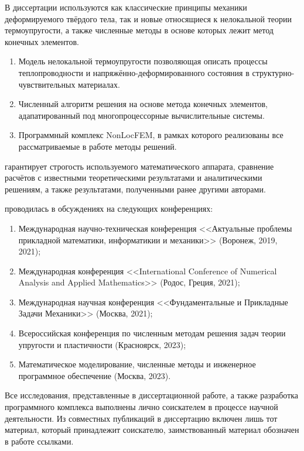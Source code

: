 {\methods}
В диссертации используются как классические принципы механики деформируемого твёрдого тела, так и новые относящиеся к нелокальной теории термоупругости, а также численные методы в основе которых лежит метод конечных элементов.

{}
\begin{enumerate}[beginpenalty=10000] %
 	\item Модель нелокальной термоупругости позволяющая описать процессы теплопроводности и напряжённо-деформированного состояния в структурно-чувствительных материалах.
	\item Численный алгоритм решения на основе метода конечных элементов, адапатированный под многопроцессорные вычислительные системы.
	\item Программный комплекс NonLocFEM, в рамках которого реализованы все рассматриваемые в работе методы решений.
\end{enumerate}

{\reliability} гарантирует строгость используемого математического аппарата, сравнение расчётов с известными теоретическими результатами и аналитическими решениям, а также результатами, полученными ранее другими авторами.


{\probation}
проводилась в обсуждениях на следующих конференциях:
\begin{enumerate}
	\item Международная научно-техническая конференция <<Актуальные проблемы прикладной математики, информатикии и механики>> (Воронеж, 2019, 2021);
	\item Международная конференция <<International Conference of Numerical Analysis and Applied Mathematics>> (Родос, Греция, 2021);
	\item Международная научная конференция <<Фундаментальные и Прикладные Задачи Механики>> (Москва, 2021);
	\item Всероссийская конференция по численным методам решения задач теории упругости и пластичности (Красноярск, 2023);
	\item Математическое моделирование, численные методы и инженерное программное обеспечение (Москва, 2023).
\end{enumerate}

{\contribution}
Все исследования, представленные в диссертационной работе, а также разработка программного комплекса выполнены лично соискателем в процессе научной деятельности. Из совместных публикаций в диссертацию включен лишь тот материал, который принадлежит соискателю, заимствованный материал обозначен в работе ссылками.

